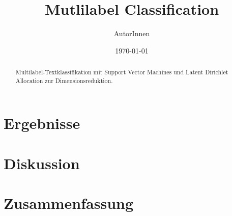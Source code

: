 \documentclass{scrartcl}
\title{Mutlilabel Classification}
\author{AutorInnen}
\date{\today}
\begin{document}
\maketitle

\begin{abstract}
    Multilabel-Textklassifikation mit Support Vector Machines und Latent Dirichlet Allocation zur Dimensionsreduktion.
\end{abstract}

\tableofcontents





\section{Ergebnisse}

\section{Diskussion}

\section{Zusammenfassung}

\nocite{*}



\end{document}

